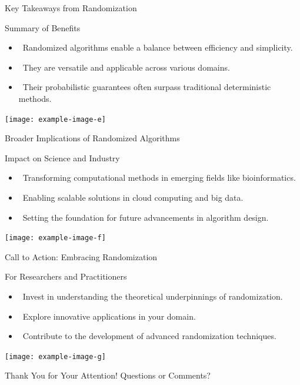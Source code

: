 \documentclass{beamer}
\begin{document}
\begin{frame}{Key Takeaways from Randomization}
    \begin{block}{Summary of Benefits}
        \begin{itemize}
            \item<1-> \faBalanceScale \ Randomized algorithms enable a \alert{balance between efficiency and simplicity}.
            \item<2-> \faCompass \ They are versatile and applicable across \alert{various domains}.
            \item<3-> \faShieldAlt \ Their \alert{probabilistic guarantees} often surpass traditional deterministic methods.
        \end{itemize}
    \end{block}
    \vspace{0.5cm}
    \centering
    \texttt{[image: example-image-e]}
\end{frame}

\begin{frame}{Broader Implications of Randomized Algorithms}
    \begin{block}{Impact on Science and Industry}
        \begin{itemize}
            \item<1-> \faDna \ Transforming computational methods in \alert{emerging fields} like bioinformatics.
            \item<2-> \faCloud \ Enabling \alert{scalable solutions} in cloud computing and big data.
            \item<3-> \faRocket \ Setting the foundation for \alert{future advancements} in algorithm design.
        \end{itemize}
    \end{block}
    \vspace{0.5cm}
    \centering
    \texttt{[image: example-image-f]}
\end{frame}

\begin{frame}{Call to Action: Embracing Randomization}
    \begin{block}{For Researchers and Practitioners}
        \begin{itemize}
            \item<1-> \faBookOpen \ Invest in understanding the \alert{theoretical underpinnings} of randomization.
            \item<2-> \faLightbulb \ Explore innovative applications in \alert{your domain}.
            \item<3-> \faCodeBranch \ Contribute to the development of \alert{advanced randomization techniques}.
        \end{itemize}
    \end{block}
    \vfill
    \centering
    \texttt{[image: example-image-g]}
\end{frame}

\begin{frame}[standout]
    \Huge Thank You for Your Attention!
    \vspace{0.5cm}
    \LARGE Questions or Comments?
\end{frame}
\end{document}
